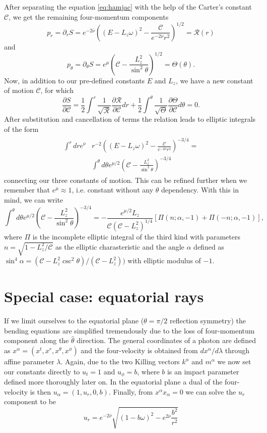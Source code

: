 \documentclass[iop, usenatbib]{emulateapj}
\newcommand{\be}{\begin{equation}}
\newcommand{\ee}{\end{equation}}
\newcommand{\pd}{\ensuremath{\partial}} %
\newcommand{\Ca}{\ensuremath{\mathcal{C}}}
\newcommand{\nub}{\ensuremath{\bar{\nu}}}
\begin{document}
After separating the equation \eqref{eq:hamjac} with the help of the
Carter's constant $\Ca$, we get the remaining four-momentum components
\be\label{eq:pr}
p_r = \pd_r S = e^{-2\nub} \left( (E-L_z \omega)^2 - \frac{\mathcal{C}}{e^{-2\nub} r^2} \right)^{1/2} = \mathcal{R}(r)
\ee
and
\be\label{eq:ptheta}
p_{\theta} = \pd_{\theta} S = e^{\mu} \left( \mathcal{C} - \frac{L_z^2}{\sin^2 \theta} \right)^{1/2} = \Theta(\theta).
\ee
Now, in addition to our pre-defined constants $E$ and $L_z$, we have a
new constant of motion $\Ca$, for which
\be
\frac{\pd S}{\pd \mathcal{C}} = \frac{1}{2} \int^r \frac{1}{\sqrt{\mathcal{R}}} \frac{\pd \mathcal{R}}{\pd \mathcal{C}} dr + \frac{1}{2} \int^{\theta} \frac{1}{\sqrt{\Theta}} \frac{\pd \Theta}{\pd \mathcal{C}} d\theta = 0.
\ee 
After substitution and cancellation of terms the relation leads to elliptic integrals of the form
\begin{align}\begin{split}\label{eq:Lz_C_rel}
 \int^r dr e^{\nub} & r^{-2} \left( (E-L_z\omega)^2 - \frac{\mathcal{C}}{e^{-2\nub} r^2} \right)^{-3/4}  = \\
& \int^{\theta} d\theta e^{\mu/2} \left(\mathcal{C} - \frac{L_z^2}{\sin^2 \theta} \right)^{-3/4}
\end{split}\end{align}
connecting our three constants of motion.
This can be refined further
when we remember that $e^{\mu} \approx 1$, i.e. constant without any $\theta$ dependency. 
With this in mind, we can write
\be
\int^{\theta} d\theta e^{\mu/2} \left(\mathcal{C} - \frac{L_z^2}{\sin^2
\theta} \right)^{-3/4} = -\frac{e^{\mu/2} L_z}{\mathcal{C} (\mathcal{C}-L_z^2)^{1/4}} [ \Pi(n; \alpha, -1)+\Pi(-n;\alpha, -1)],
\ee
where $\Pi$ is the incomplete elliptic integral of the third kind with
parameters $n = \sqrt{1-L_z^2/\mathcal{C}}$ as the elliptic
charasteristic and the angle $\alpha$ defined as $\sin^4 \alpha =
(\mathcal{C}-L_z^2 \csc^2 \theta)/(\mathcal{C}-L_z^2))$ with elliptic
modulus of $-1$.


\section{Special case: equatorial rays}
If we limit ourselves to the equatorial plane ($\theta=\pi/2$ reflection symmetry) the bending equations are simplified tremendously due to the loss of four-momentum component along the $\hat{\theta}$ direction.
The general coordinates of a photon are defined as $x^{\alpha} = (x^{t}, x^{r}, x^{\theta}, x^{\phi})$ and the four-velocity is obtained from $dx^{\alpha}/d\lambda$ through affine parameter $\lambda$.
Again, due to the two Killing vectors $k^{\alpha}$ and $m^{\alpha}$ we now set our constants directly to $u_{t} = 1$ and $u_{\phi} = b$, where $b$ is an impact parameter defined more thoroughly later on.
In the equatorial plane a dual of the four-velocity is then $u_{\alpha} = (1, u_{r}, 0, b)$.
Finally, from $x^{\alpha}x_{\alpha} = 0$ we can solve the $u_{r}$ component to be
\be
u_{r} = e^{-2\nub}\sqrt{(1-b\omega)^2 - e^{2\nub}\frac{b^2}{r^2}} 
\ee
\end{document}
